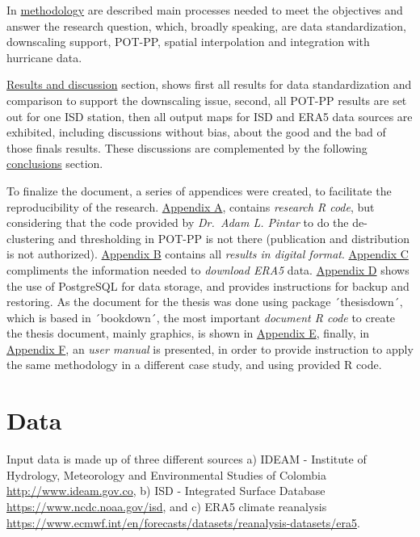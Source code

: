 \documentclass[12pt,oneside]{reedthesis}
\begin{document}
In \protect\hyperlink{rmd-method}{methodology} are described main processes needed to meet the objectives and answer the research question, which, broadly speaking, are data standardization, downscaling support, POT-PP, spatial interpolation and integration with hurricane data.

\protect\hyperlink{rmd-results}{Results and discussion} section, shows first all results for data standardization and comparison to support the downscaling issue, second, all POT-PP results are set out for one ISD station, then all output maps for ISD and ERA5 data sources are exhibited, including discussions without bias, about the good and the bad of those finals results. These discussions are complemented by the following \protect\hyperlink{conclusions}{conclusions} section.

To finalize the document, a series of appendices were created, to facilitate the reproducibility of the research. \protect\hyperlink{rcode}{Appendix A}, contains \emph{research R code}, but considering that the code provided by \emph{Dr.~Adam L. Pintar} to do the de-clustering and thresholding in POT-PP is not there (publication and distribution is not authorized). \protect\hyperlink{results}{Appendix B} contains all \emph{results in digital format}. \protect\hyperlink{datadownload}{Appendix C} compliments the information needed to \emph{download ERA5} data. \protect\hyperlink{dbstoring}{Appendix D} shows the use of PostgreSQL for data storage, and provides instructions for backup and restoring. As the document for the thesis was done using package ´thesisdown´, which is based in ´bookdown´, the most important \emph{document R code} to create the thesis document, mainly graphics, is shown in \protect\hyperlink{docrcode}{Appendix E}, finally, in \protect\hyperlink{manual}{Appendix F}, an \emph{user manual} is presented, in order to provide instruction to apply the same methodology in a different case study, and using provided R code.

\hypertarget{rmd-data}{%
\chapter{Data}\label{rmd-data}}

Input data is made up of three different sources a) IDEAM - Institute of Hydrology, Meteorology and Environmental Studies of Colombia \url{http://www.ideam.gov.co}, b) ISD - Integrated Surface Database \url{https://www.ncdc.noaa.gov/isd}, and c) ERA5 climate reanalysis \url{https://www.ecmwf.int/en/forecasts/datasets/reanalysis-datasets/era5}.
\end{document}
